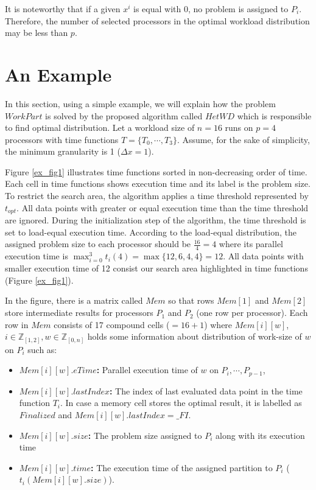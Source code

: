 \documentclass[12pt]{article}
\begin{document}
It is noteworthy that if a given $x^i$ is equal with 0, no problem is assigned to $P_i$. Therefore, the number of selected processors in the optimal workload distribution may be less than $p$.

\section{An Example}
In this section, using a simple example, we will explain how the problem $WorkPart$ is solved by the proposed algorithm called $HetWD$ which is responsible to find optimal distribution. Let a workload size of $n = 16$ runs on $p = 4$ processors with time functions $T=\{T_0,\cdots,T_3\}$. Assume, for the sake of simplicity, the minimum granularity is 1 ($\Delta x = 1$). 

Figure \ref{ex_fig1} illustrates time functions sorted in non-decreasing order of time. Each cell in time functions shows execution time and its label is the problem size. To restrict the search area, the algorithm applies a time threshold represented by $t_{opt}$. All data points with greater or equal execution time than the time threshold are ignored. During the initialization step of the algorithm, the time threshold is set to load-equal execution time. According to the load-equal distribution, the assigned problem size to each processor should be $\frac{16}{4}=4$ where its parallel execution time is $\max_{i=0}^{3} t_i(4) = \max \{12,6,4,4\} = 12$. All data points with smaller execution time of 12 consist our search area highlighted in time functions (Figure \ref{ex_fig1}).

In the figure, there is a matrix called $Mem$ so that rows $Mem[1]$ and $Mem[2]$ store intermediate results for processors $P_1$ and $P_2$ (one row per processor). Each row in $Mem$ consists of 17 compound cells ($=16+1$) where $Mem[i][w]$, $i \in \mathbb{Z}_{[1,2]}, w \in \mathbb{Z}_{[0,n]}$ holds some information about distribution of work-size of $w$ on $P_i$ such as:

\begin{itemize}
	\item \textbf{$Mem[i][w].eTime$:} Parallel execution time of $w$ on $P_i,\cdots,P_{p-1}$,
	\item \textbf{$Mem[i][w].lastIndex$:} The index of last evaluated data point in the time function $T_i$. In case a memory cell stores the optimal result, it is labelled as $Finalized$ and $Mem[i][w].lastIndex = \_FI$.
	\item \textbf{$Mem[i][w].size$:} The problem size assigned to $P_i$ along with its execution time
	\item \textbf{$Mem[i][w].time$:} The execution time of the assigned partition to $P_i$ ($t_i(Mem[i][w].size)$).
	
\end{itemize}
\end{document}
